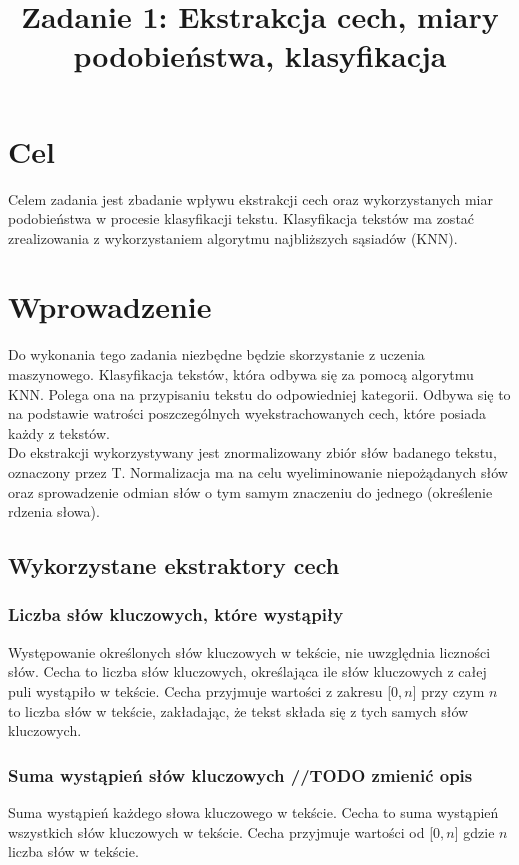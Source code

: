 \documentclass{classrep}
\author{
  \studentinfo{Konrad Jachimstal}{211807} \and
  \studentinfo{ Patryk Janicki}{211951}
}
\title{Zadanie 1: Ekstrakcja cech, miary podobieństwa, klasyfikacja}
\begin{document}
\maketitle

\section{Cel}
{Celem zadania jest zbadanie wpływu ekstrakcji cech oraz wykorzystanych miar podobieństwa w procesie klasyfikacji tekstu. 
Klasyfikacja tekstów ma zostać zrealizowania z wykorzystaniem algorytmu najbliższych sąsiadów (KNN).}

\section{Wprowadzenie}
Do wykonania tego zadania niezbędne będzie skorzystanie z uczenia maszynowego.
Klasyfikacja tekstów, która odbywa się za pomocą algorytmu KNN. Polega ona na przypisaniu tekstu do odpowiedniej
kategorii. Odbywa się to na podstawie watrości poszczególnych wyekstrachowanych cech, które posiada każdy z tekstów.\\
Do ekstrakcji wykorzystywany jest znormalizowany zbiór słów badanego tekstu, oznaczony przez T. Normalizacja ma na
celu wyeliminowanie niepożądanych słów oraz sprowadzenie odmian słów o tym samym znaczeniu do jednego (określenie rdzenia słowa).

\subsection{Wykorzystane ekstraktory cech}

\subsubsection{Liczba słów kluczowych, które wystąpiły}
Występowanie określonych słów kluczowych w tekście,
nie uwzględnia liczności słów. Cecha to liczba słów kluczowych,
określająca ile słów kluczowych z całej puli wystąpiło w tekście.
Cecha przyjmuje wartości z zakresu [$0, n$] przy czym $n$ to liczba słów w tekście, zakładając, że
tekst składa się z tych samych słów kluczowych.

\subsubsection{Suma wystąpień słów kluczowych //TODO zmienić opis}
Suma wystąpień każdego słowa kluczowego w tekście. Cecha to suma wystąpień wszystkich słów kluczowych w tekście.
Cecha przyjmuje wartości od [$0, n$] gdzie $n$ liczba słów w tekście.
\end{document}
